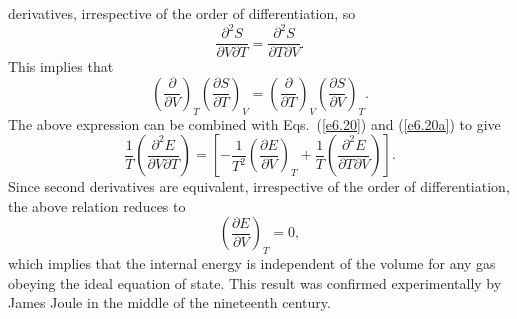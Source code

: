 derivatives, irrespective of the order of differentiation, so 
\begin{equation}
\frac{\partial ^2 S}{\partial V \partial T} = \frac{\partial ^2 S}
{\partial T \partial V}.
\end{equation}
This implies that
\begin{equation}
\left(\frac{\partial}{\partial V}\right)_T \left(\frac{\partial S}{\partial T}
\right)_V = \left(\frac{\partial }{\partial T}\right)_V \left(\frac{\partial S}
{\partial V}\right)_T.
\end{equation}
The above expression can be combined with  Eqs.~(\ref{e6.20}) and
(\ref{e6.20a}) to give
\begin{equation}
\frac{1}{T} \left(\frac{\partial ^2 E}{\partial V \partial T}\right)
= \left[ - \frac{1}{T^2} \left(\frac{\partial E}{\partial V}\right)_T
+ \frac{1}{T} \left (\frac{\partial^2 E}{\partial T \partial V}\right)\right].
\end{equation}
Since second derivatives are equivalent, irrespective of the order of 
differentiation,
the above relation reduces to
\begin{equation}
\left(\frac{\partial E}{\partial V}\right)_T =0,
\end{equation}
which implies that the internal energy is independent of the volume for any gas obeying
the ideal equation of state. This result
was confirmed experimentally by James Joule in
the middle of the nineteenth century.

